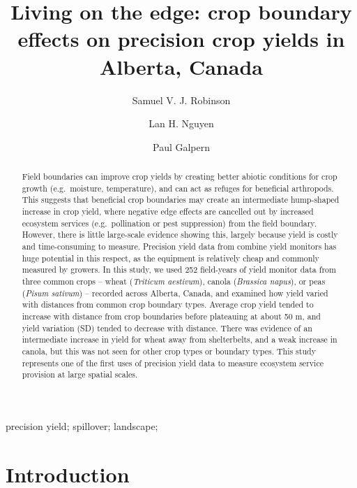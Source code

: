 \documentclass[]{elsarticle} %
\begin{document}
\begin{frontmatter}

  \title{Living on the edge: crop boundary effects on precision crop yields in Alberta, Canada}
    \author[University of Calgary]{Samuel V. J. Robinson}
    \author[University of Calgary]{Lan H. Nguyen}
    \author[University of Calgary]{Paul Galpern}
      \address[University of Calgary]{2500 University Drive NW, Calgary, AB}
  
  \begin{abstract}
  Field boundaries can improve crop yields by creating better abiotic conditions for crop growth (e.g.~moisture, temperature), and can act as refuges for beneficial arthropods. This suggests that beneficial crop boundaries may create an intermediate hump-shaped increase in crop yield, where negative edge effects are cancelled out by increased ecosystem services (e.g.~pollination or pest suppression) from the field boundary. However, there is little large-scale evidence showing this, largely because yield is costly and time-consuming to measure. Precision yield data from combine yield monitors has huge potential in this respect, as the equipment is relatively cheap and commonly measured by growers. In this study, we used 252 field-years of yield monitor data from three common crops -- wheat (\emph{Triticum aestivum}), canola (\emph{Brassica napus}), or peas (\emph{Pisum sativum}) -- recorded across Alberta, Canada, and examined how yield varied with distances from common crop boundary types. Average crop yield tended to increase with distance from crop boundaries before plateauing at about 50 m, and yield variation (SD) tended to decrease with distance. There was evidence of an intermediate increase in yield for wheat away from shelterbelts, and a weak increase in canola, but this was not seen for other crop types or boundary types. This study represents one of the first uses of precision yield data to measure ecosystem service provision at large spatial scales.
  \end{abstract}
   \begin{keyword} precision yield; spillover; landscape;\end{keyword}
 \end{frontmatter}

\newpage
\doublespacing

\hypertarget{introduction}{%
\section{Introduction}\label{introduction}}
\end{document}
